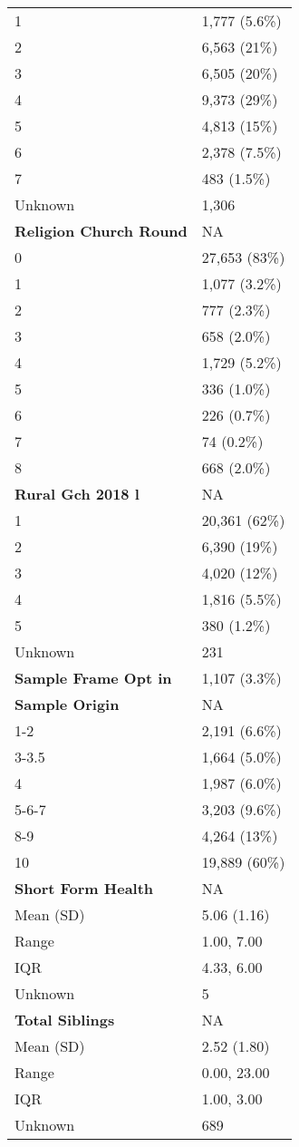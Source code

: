 \documentclass[
  single column]{article}
\begin{document}
\begin{longtable}[]{@{}ll@{}}
1 & 1,777 (5.6\%) \\
2 & 6,563 (21\%) \\
3 & 6,505 (20\%) \\
4 & 9,373 (29\%) \\
5 & 4,813 (15\%) \\
6 & 2,378 (7.5\%) \\
7 & 483 (1.5\%) \\
Unknown & 1,306 \\
\textbf{Religion Church Round} & NA \\
0 & 27,653 (83\%) \\
1 & 1,077 (3.2\%) \\
2 & 777 (2.3\%) \\
3 & 658 (2.0\%) \\
4 & 1,729 (5.2\%) \\
5 & 336 (1.0\%) \\
6 & 226 (0.7\%) \\
7 & 74 (0.2\%) \\
8 & 668 (2.0\%) \\
\textbf{Rural Gch 2018 l} & NA \\
1 & 20,361 (62\%) \\
2 & 6,390 (19\%) \\
3 & 4,020 (12\%) \\
4 & 1,816 (5.5\%) \\
5 & 380 (1.2\%) \\
Unknown & 231 \\
\textbf{Sample Frame Opt in} & 1,107 (3.3\%) \\
\textbf{Sample Origin} & NA \\
1-2 & 2,191 (6.6\%) \\
3-3.5 & 1,664 (5.0\%) \\
4 & 1,987 (6.0\%) \\
5-6-7 & 3,203 (9.6\%) \\
8-9 & 4,264 (13\%) \\
10 & 19,889 (60\%) \\
\textbf{Short Form Health} & NA \\
Mean (SD) & 5.06 (1.16) \\
Range & 1.00, 7.00 \\
IQR & 4.33, 6.00 \\
Unknown & 5 \\
\textbf{Total Siblings} & NA \\
Mean (SD) & 2.52 (1.80) \\
Range & 0.00, 23.00 \\
IQR & 1.00, 3.00 \\
Unknown & 689 \\

\end{longtable}
\end{document}
